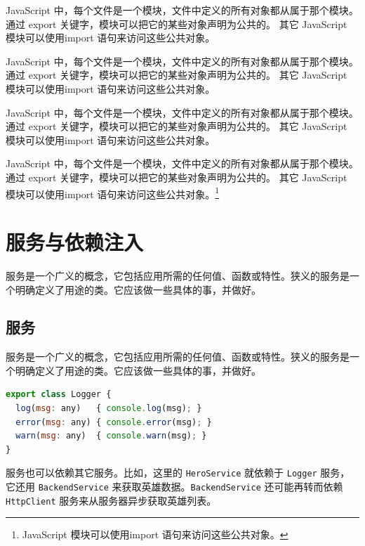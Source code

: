 \documentclass{progbookcn}
\begin{document}
\begin{question}
  JavaScript 中，每个文件是一个模块，文件中定义的所有对象都从属于那个模块。 通过 export 关键字，模块可以把它的某些对象声明为公共的。 其它 JavaScript 模块可以使用import 语句来访问这些公共对象。
\end{question}

\begin{keypoint}
  JavaScript 中，每个文件是一个模块，文件中定义的所有对象都从属于那个模块。 通过 export 关键字，模块可以把它的某些对象声明为公共的。 其它 JavaScript 模块可以使用import 语句来访问这些公共对象。
\end{keypoint}

\begin{exclamation}
  JavaScript 中，每个文件是一个模块，文件中定义的所有对象都从属于那个模块。 通过 export 关键字，模块可以把它的某些对象声明为公共的。 其它 JavaScript 模块可以使用import 语句来访问这些公共对象。
\end{exclamation}


JavaScript 中，每个文件是一个模块，文件中定义的所有对象都从属于那个模块。 通过 export 关键字，模块可以把它的某些对象声明为公共的。 其它 JavaScript 模块可以使用import 语句来访问这些公共对象。\footnote{JavaScript 模块可以使用import 语句来访问这些公共对象。}

\chapter{服务与依赖注入}

服务是一个广义的概念，它包括应用所需的任何值、函数或特性。狭义的服务是一个明确定义了用途的类。它应该做一些具体的事，并做好。


\section{服务}

服务是一个广义的概念，它包括应用所需的任何值、函数或特性。狭义的服务是一个明确定义了用途的类。它应该做一些具体的事，并做好。

\begin{lstlisting}[language=JavaScript,caption={src/app/app.module.ts}]
export class Logger {
  log(msg: any)   { console.log(msg); }
  error(msg: any) { console.error(msg); }
  warn(msg: any)  { console.warn(msg); }
}
\end{lstlisting}

服务也可以依赖其它服务。比如，这里的 \verb|HeroService| 就依赖于 \verb|Logger| 服务，它还用 \verb|BackendService| 来获取英雄数据。\verb|BackendService| 还可能再转而依赖 \verb|HttpClient| 服务来从服务器异步获取英雄列表。
\end{document}
